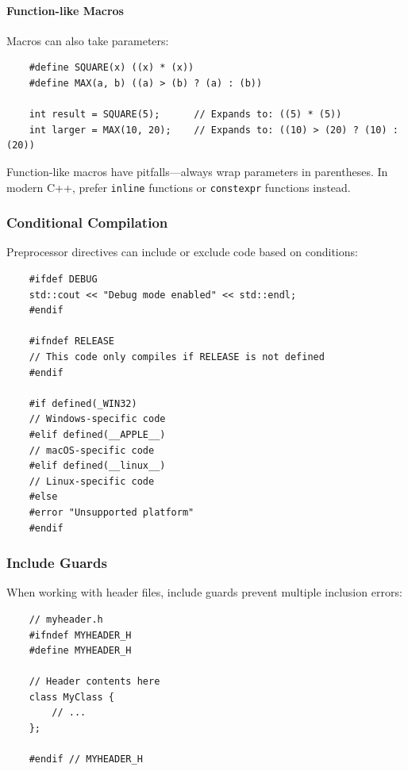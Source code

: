 \paragraph{Function-like Macros}

Macros can also take parameters:

\begin{lstlisting}
	#define SQUARE(x) ((x) * (x))
	#define MAX(a, b) ((a) > (b) ? (a) : (b))
	
	int result = SQUARE(5);      // Expands to: ((5) * (5))
	int larger = MAX(10, 20);    // Expands to: ((10) > (20) ? (10) : (20))
\end{lstlisting}

\begin{remark}
	Function-like macros have pitfalls—always wrap parameters in parentheses. In modern C++, prefer \texttt{inline} functions or \texttt{constexpr} functions instead.
\end{remark}

\subsubsection{Conditional Compilation}

Preprocessor directives can include or exclude code based on conditions:

\begin{lstlisting}
	#ifdef DEBUG
	std::cout << "Debug mode enabled" << std::endl;
	#endif
	
	#ifndef RELEASE
	// This code only compiles if RELEASE is not defined
	#endif
	
	#if defined(_WIN32)
	// Windows-specific code
	#elif defined(__APPLE__)
	// macOS-specific code
	#elif defined(__linux__)
	// Linux-specific code
	#else
	#error "Unsupported platform"
	#endif
\end{lstlisting}

\subsubsection{Include Guards}

When working with header files, include guards prevent multiple inclusion errors:

\begin{lstlisting}
	// myheader.h
	#ifndef MYHEADER_H
	#define MYHEADER_H
	
	// Header contents here
	class MyClass {
		// ...
	};
	
	#endif // MYHEADER_H
\end{lstlisting}

